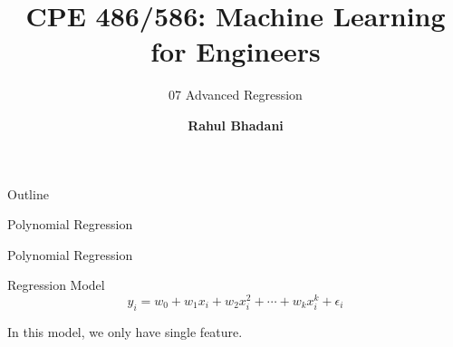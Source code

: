 \documentclass[aspectratio=169,xcolor=dvipsnames,svgnames,x11names,fleqn]{beamer}
\title[CPE 486/586: Machine Learning]{CPE 486/586: Machine Learning for Engineers} %
\subtitle{07 Advanced Regression}
\author[Rahul Bhadani] {{\Large \textbf{Rahul Bhadani}}}
\institute[UAH] %
{
    Electrical \& Computer Engineering,  The University of Alabama in Huntsville
}
\date
\begin{document}
\begin{frame}
    \titlepage
\end{frame}

\begin{frame}{Outline}
    \backgroundtableofcontents
\end{frame}



\begin{sectionframe}{\faGroup}{Polynomial Regression}
\end{sectionframe}

\begin{frame}[allowframebreaks]{Polynomial Regression}
\Large
    \begin{tblock}{Regression Model}
        \begin{equation}
            y_i = w_0 + w_1 x_{i} + w_2 x_{i}^2 + \cdots  + w_k x_{i}^k + \epsilon_i
        \end{equation}
    \end{tblock}
    
    In this model, we only have single feature.
\end{frame}
    
\end{document}
